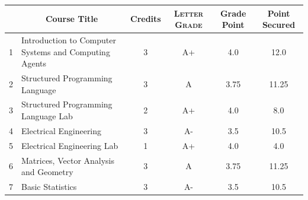 \documentclass[11pt]{article}
\newcommand*{\numtwo}[1]{\pgfmathprintnumber[
                    fixed, precision=2, fixed zerofill=true]{#1}}
\begin{document}
                \begin{center}
                    \renewcommand{\arraystretch}{1.08}
                    
                \begin{tabular}{|c|l|c|>{\scshape}c|c|c|}
                \hline  \rule[-1ex]{0pt}{3.5ex} {\centering{\bf Course Code}} &  \multicolumn{1}{c|}{\textbf{Course Title}}  & {\bf Credits} & {\bf Letter Grade} & {\bf Grade Point} & {\bf Point Secured}  \\ 
                \hline   1 &  Introduction to Computer Systems and Computing Agents		 & 3 & A+ & 4.0 & 12.0 \\ %
                \hline   2 &  Structured Programming Language		 & 3 & A & 3.75 & 11.25 \\ %
                \hline   3 &  Structured Programming Language Lab		 & 2 & A+ & 4.0 & 8.0 \\ %
                \hline   4 &  Electrical Engineering		 & 3 & A- & 3.5 & 10.5 \\ %
                \hline   5 &  Electrical Engineering Lab		 & 1 & A+ & 4.0 & 4.0 \\ %
                \hline   6 &  Matrices, Vector Analysis and Geometry		 & 3 & A & 3.75 & 11.25 \\ %
                \hline   7 &  Basic Statistics		 & 3 & A- & 3.5 & 10.5 \\ %

\hline                %
                \end{tabular}
                \end{center}
                \renewcommand{\arraystretch}{1.03}
\end{document}
